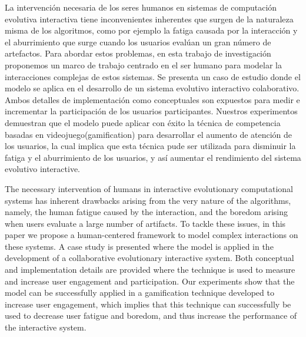 


La intervención necesaria de los seres humanos en sistemas de computaci\'on
evolutiva interactiva tiene inconvenientes inherentes que surgen de la
naturaleza misma de los algoritmos, como por ejemplo la fatiga causada por la
interacci\'on y el  aburrimiento que surge cuando los usuarios eval\'uan un gran
n\'umero de artefactos. Para abordar estos problemas, en esta trabajo de
investigaci\'on proponemos un marco de trabajo centrado en el ser humano para
modelar la interacciones complejas de estos sistemas. Se presenta un caso de
estudio donde el  modelo se aplica en el desarrollo de un sistema evolutivo
interactivo colaborativo.  Ambos detalles de implementaci\'on como conceptuales
son expuestos para medir e incrementar la participaci\'on de los usuarios
participantes. Nuestros experimentos demuestran que el modelo puede aplicar con
éxito la  t\'ecnica de competencia basadas en videojuego(gamification) para
desarrollar el aumento de atenci\'on de los usuarios, la cual implica que esta
t\'ecnica pude ser utilizada para disminuir la fatiga y el aburrimiento de los
usuarios, y as\'i aumentar el rendimiento del sistema evolutivo interactive.





The necessary intervention of humans in interactive evolutionary computational
systems has inherent drawbacks arising from the very nature of the algorithms,
namely, the human fatigue caused by the interaction, and the boredom arising
when users evaluate a large number of artifacts. To tackle these issues, in this
paper we propose a human-centered framework to model complex interactions on
these systems. A case study is presented where the model is applied in the
development of a collaborative evolutionary interactive system. Both conceptual
and implementation details are provided where the technique is used to measure
and increase user engagement and participation. Our experiments show that the
model can be successfully applied in a gamification technique developed to
increase user engagement, which implies that this technique can successfully be
used to decrease user fatigue and boredom, and thus increase the performance of
the interactive system.
